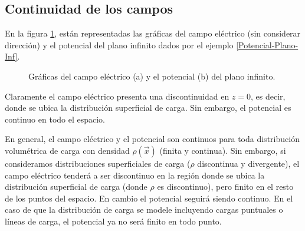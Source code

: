 \subsection{Continuidad de los campos}

En la figura \ref{fig:Campo-Plano-Inf}, están representadas las gráficas del campo eléctrico (sin considerar dirección) y el potencial del plano infinito dados por el ejemplo \ref{Potencial-Plano-Inf}.

    \begin{figure}[H]
        \centering
         \hspace{1cm}
        \caption{Gráficas del campo eléctrico (a) y el potencial (b) del plano infinito.}
        \label{fig:Campo-Plano-Inf}
    \end{figure}

Claramente el campo eléctrico presenta una discontinuidad en $z = 0$, es decir, donde se ubica la distribución superficial de carga. Sin embargo, el potencial es continuo en todo el espacio.  

En general, el campo eléctrico y el potencial son continuos para toda distribución volumétrica de carga con densidad $\rho(\Vec{x})$ (finita y continua). Sin embargo, si consideramos distribuciones superficiales de carga ($\rho$ discontinua y divergente), el campo eléctrico tenderá a ser discontinuo en la región donde se ubica la distribución superficial de carga (donde $\rho$ es discontinuo), pero finito en el resto de los puntos del espacio. En cambio el potencial seguirá siendo continuo. En el caso de que la distribución de carga se modele incluyendo cargas puntuales o líneas de carga, el potencial ya no será finito en todo punto.

